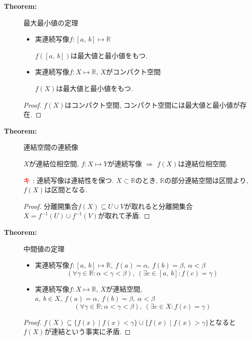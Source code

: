 \documentclass[dvipdfmx]{jsarticle}
\newcommand{\point}{\textcircled{\textcolor{red}{\scriptsize キ}} }
\begin{document}
\begin{description}
    \item[\bf{Theorem:}] 最大最小値の定理
        \begin{itemize}
            \item 実連続写像$f : [a,\ b] \mapsto \mathbb{R}$
            \begin{center}$f([a,\ b])$は最大値と最小値をもつ.\end{center}
            \item 実連続写像$f: X \mapsto \mathbb{R}$, $X$がコンパクト空間 
            \begin{center}$f(X)$は最大値と最小値をもつ.\end{center}
        \end{itemize}
        \begin{proof}
            $f(X)$はコンパクト空間, コンパクト空間には最大値と最小値が存在.
        \end{proof}

    \item[\bf{Theorem:}] 連結空間の連続像
        \begin{center} $X$が連結位相空間, $f : X \mapsto Y$が連続写像 $\Rightarrow$ $f(X)$は連結位相空間. \end{center}
        \point : 連続写像は連結性を保つ. $X \subset \mathbb{R}$のとき, $\mathbb{R}$の部分連結空間は区間より, $f(X)$は区間となる. \\
        \begin{proof}
            分離開集合$f(X) \subseteq U \cup V$が取れると分離開集合$X = f^{-1}(U) \cup f^{-1}(V)$が取れて矛盾.
        \end{proof}
        
    \item[\bf{Theorem:}] 中間値の定理
        \begin{itemize}
            \item 実連続写像$f : [a,\ b] \mapsto \mathbb{R},\ f(a) = \alpha,\ f(b) = \beta,\ \alpha < \beta$
                $$ (\forall \gamma \in \mathbb{R}: \alpha < \gamma < \beta),\ (\exists c \in [a,\ b] : f(c) = \gamma) $$

            \item 実連続写像$f: X \mapsto \mathbb{R}$, $X$が連結空間, $a,\ b \in X,\ f(a) = \alpha,\ f(b) = \beta,\ \alpha < \beta$\\
            $$ (\forall \gamma \in \mathbb{R}: \alpha < \gamma < \beta),\ (\exists c \in X : f(c) = \gamma) $$
        \end{itemize}
        \begin{proof}
            $f(X) \subseteq \{ f(x) \mid f(x) < \gamma \} \cup \{ f(x) \mid f(x) > \gamma \}$となると$f(X)$が連結という事実に矛盾.
        \end{proof}
    

\end{description}
\end{document}

